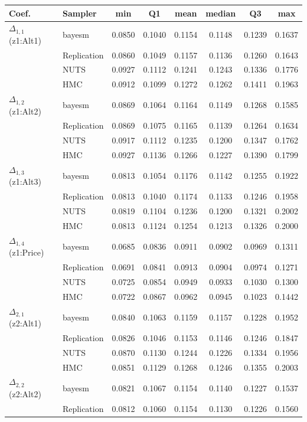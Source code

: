 \begin{tabular}{llcccccc}
\toprule
Coef. & Sampler & min & Q1 & mean & median & Q3 & max \\
\midrule
$\Delta_{1,1}$ (z1:Alt1) & bayesm & 0.0850 & 0.1040 & 0.1154 & 0.1148 & 0.1239 & 0.1637 \\
 & Replication & 0.0860 & 0.1049 & 0.1157 & 0.1136 & 0.1260 & 0.1643 \\
 & NUTS & 0.0927 & 0.1112 & 0.1241 & 0.1243 & 0.1336 & 0.1776 \\
 & HMC & 0.0912 & 0.1099 & 0.1272 & 0.1262 & 0.1411 & 0.1963 \\
$\Delta_{1,2}$ (z1:Alt2) & bayesm & 0.0869 & 0.1064 & 0.1164 & 0.1149 & 0.1268 & 0.1585 \\
 & Replication & 0.0869 & 0.1075 & 0.1165 & 0.1139 & 0.1264 & 0.1634 \\
 & NUTS & 0.0917 & 0.1112 & 0.1235 & 0.1200 & 0.1347 & 0.1762 \\
 & HMC & 0.0927 & 0.1136 & 0.1266 & 0.1227 & 0.1390 & 0.1799 \\
$\Delta_{1,3}$ (z1:Alt3) & bayesm & 0.0813 & 0.1054 & 0.1176 & 0.1142 & 0.1255 & 0.1922 \\
 & Replication & 0.0813 & 0.1040 & 0.1174 & 0.1133 & 0.1246 & 0.1958 \\
 & NUTS & 0.0819 & 0.1104 & 0.1236 & 0.1200 & 0.1321 & 0.2002 \\
 & HMC & 0.0813 & 0.1124 & 0.1254 & 0.1213 & 0.1326 & 0.2000 \\
$\Delta_{1,4}$ (z1:Price) & bayesm & 0.0685 & 0.0836 & 0.0911 & 0.0902 & 0.0969 & 0.1311 \\
 & Replication & 0.0691 & 0.0841 & 0.0913 & 0.0904 & 0.0974 & 0.1271 \\
 & NUTS & 0.0725 & 0.0854 & 0.0949 & 0.0933 & 0.1030 & 0.1300 \\
 & HMC & 0.0722 & 0.0867 & 0.0962 & 0.0945 & 0.1023 & 0.1442 \\
$\Delta_{2,1}$ (z2:Alt1) & bayesm & 0.0840 & 0.1063 & 0.1159 & 0.1157 & 0.1228 & 0.1952 \\
 & Replication & 0.0826 & 0.1046 & 0.1153 & 0.1146 & 0.1246 & 0.1847 \\
 & NUTS & 0.0870 & 0.1130 & 0.1244 & 0.1226 & 0.1334 & 0.1956 \\
 & HMC & 0.0851 & 0.1129 & 0.1268 & 0.1246 & 0.1355 & 0.2003 \\
$\Delta_{2,2}$ (z2:Alt2) & bayesm & 0.0821 & 0.1067 & 0.1154 & 0.1140 & 0.1227 & 0.1537 \\
 & Replication & 0.0812 & 0.1060 & 0.1154 & 0.1130 & 0.1226 & 0.1560 \\

\end{tabular}
